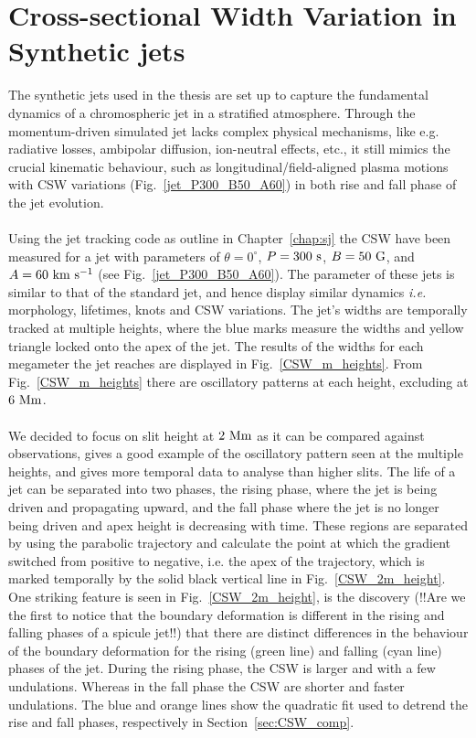 \documentclass[12pt]{ociamthesis}
\newcommand{\kms}{~\rm{km ~s^{-1}}}
\newcommand{\np}{\\ \\}
\newcommand{\degs}{^{\circ}}
\begin{document}
\section{Cross-sectional Width Variation in Synthetic jets}
\label{sec:CSW_syn_jet}
The synthetic jets used in the thesis are set up to capture the fundamental dynamics of a chromospheric jet in a stratified atmosphere. Through the momentum-driven simulated jet lacks complex physical mechanisms, like e.g. radiative losses, ambipolar diffusion, ion-neutral effects, etc., it still mimics the crucial kinematic behaviour, such as longitudinal/field-aligned plasma motions with CSW variations (Fig.~\ref{jet_P300_B50_A60}) in both rise and fall phase of the jet evolution. \np
%
Using the jet tracking code as outline in Chapter~\ref{chap:sj} the CSW have been measured for a jet with parameters of $\theta =0\degs$, $P=300~\rm{s}$, $B=50~\rm{G}$, and $A=60\kms$ (see Fig.~\ref{jet_P300_B50_A60}). The parameter of these jets is similar to that of the standard jet, and hence display similar dynamics \textit{i.e.} morphology, lifetimes, knots and CSW variations. The jet's widths are temporally tracked at multiple heights, where the blue marks measure the widths and yellow triangle locked onto the apex of the jet. The results of the widths for each megameter the jet reaches are displayed in Fig.~\ref{CSW_m_heights}. From Fig.~\ref{CSW_m_heights} there are oscillatory patterns at each height, excluding at $6~\rm{Mm}$. \np
%
We decided to focus on slit height at $2~\rm{Mm}$ as it can be compared against observations, gives a good example of the oscillatory pattern seen at the multiple heights, and gives more temporal data to analyse than higher slits. The life of a jet can be separated into two phases, the rising phase, where the jet is being driven and propagating upward, and the fall phase where the jet is no longer being driven and apex height is decreasing with time. These regions are separated by using the parabolic trajectory and calculate the point at which the gradient switched from positive to negative, i.e. the apex of the trajectory, which is marked temporally by the solid black vertical line in Fig.~\ref{CSW_2m_height}. One striking feature is seen in Fig.~\ref{CSW_2m_height}, is the discovery ({\color{green}!!Are we the first to notice that the boundary deformation is different in the rising and falling phases of a spicule jet!!}) that there are distinct differences in the behaviour of the boundary deformation for the rising (green line) and falling (cyan line) phases of the jet. During the rising phase, the CSW is larger and with a few undulations. Whereas in the fall phase the CSW are shorter and faster undulations. The blue and orange lines show the quadratic fit used to detrend the rise and fall phases, respectively in Section~\ref{sec:CSW_comp}.
\end{document}
